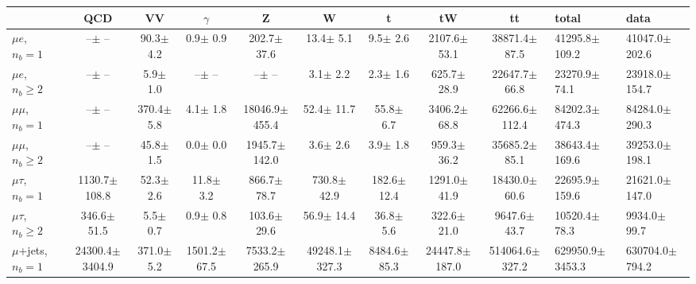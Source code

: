 \begin{sidewaystable}[p]
    \centering
    \setlength{\tabcolsep}{0.4em}
    \renewcommand{\arraystretch}{2}
    \small
    \begin{tabular}{l|cccccc|cc}
    \hline
        & QCD & VV  & $\gamma$ & Z & W & t & tW & tt & total & data      \\
    \hline
    
    $\mu e$, $n_b=1$                   &       --$\pm$     -- &     90.3$\pm$    4.2 &      0.9$\pm$    0.9 &    202.7$\pm$   37.6 &     13.4$\pm$    5.1 &      9.5$\pm$    2.6 &   2107.6$\pm$   53.1 &  38871.4$\pm$   87.5 &  41295.8$\pm$  109.2 &  41047.0$\pm$  202.6 \\ 
    $\mu e$, $n_b\geq2$                &       --$\pm$     -- &      5.9$\pm$    1.0 &       --$\pm$     -- &       --$\pm$     -- &      3.1$\pm$    2.2 &      2.3$\pm$    1.6 &    625.7$\pm$   28.9 &  22647.7$\pm$   66.8 &  23270.9$\pm$   74.1 &  23918.0$\pm$  154.7 \\ 
    \hline
    $\mu\mu$, $n_b=1$                  &       --$\pm$     -- &    370.4$\pm$    5.8 &      4.1$\pm$    1.8 &  18046.9$\pm$  455.4 &     52.4$\pm$   11.7 &     55.8$\pm$    6.7 &   3406.2$\pm$   68.8 &  62266.6$\pm$  112.4 &  84202.3$\pm$  474.3 &  84284.0$\pm$  290.3 \\ 
    $\mu\mu$, $n_b\geq2$               &       --$\pm$     -- &     45.8$\pm$    1.5 &      0.0$\pm$    0.0 &   1945.7$\pm$  142.0 &      3.6$\pm$    2.6 &      3.9$\pm$    1.8 &    959.3$\pm$   36.2 &  35685.2$\pm$   85.1 &  38643.4$\pm$  169.6 &  39253.0$\pm$  198.1 \\ 
    \hline
    $\mu\tau$, $n_b=1$                 &   1130.7$\pm$  108.8 &     52.3$\pm$    2.6 &     11.8$\pm$    3.2 &    866.7$\pm$   78.7 &    730.8$\pm$   42.9 &    182.6$\pm$   12.4 &   1291.0$\pm$   41.9 &  18430.0$\pm$   60.6 &  22695.9$\pm$  159.6 &  21621.0$\pm$  147.0 \\ 
    $\mu\tau$, $n_b\geq2$              &    346.6$\pm$   51.5 &      5.5$\pm$    0.7 &      0.9$\pm$    0.8 &    103.6$\pm$   29.6 &     56.9$\pm$   14.4 &     36.8$\pm$    5.6 &    322.6$\pm$   21.0 &   9647.6$\pm$   43.7 &  10520.4$\pm$   78.3 &   9934.0$\pm$   99.7 \\ 
    \hline
    $\mu$+jets, $n_b=1$                &  24300.4$\pm$ 3404.9 &    371.0$\pm$    5.2 &   1501.2$\pm$   67.5 &   7533.2$\pm$  265.9 &  49248.1$\pm$  327.3 &   8484.6$\pm$   85.3 &  24447.8$\pm$  187.0 & 514064.6$\pm$  327.2 & 629950.9$\pm$ 3453.3 & 630704.0$\pm$  794.2 \\ 

\end{tabular}
\end{sidewaystable}
